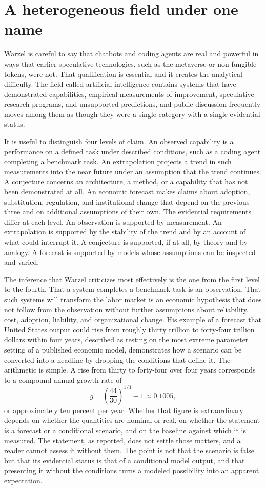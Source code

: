 \documentclass[11pt]{article}
\theoremstyle{plain}
\theoremstyle{definition}
\theoremstyle{remark}
\begin{document}
\section{A heterogeneous field under one name}

Warzel is careful to say that chatbots and coding agents are real and powerful in ways that earlier speculative technologies, such as the metaverse or non-fungible tokens, were not. That qualification is essential and it creates the analytical difficulty. The field called artificial intelligence contains systems that have demonstrated capabilities, empirical measurements of improvement, speculative research programs, and unsupported predictions, and public discussion frequently moves among them as though they were a single category with a single evidential status.

It is useful to distinguish four levels of claim. An observed capability is a performance on a defined task under described conditions, such as a coding agent completing a benchmark task. An extrapolation projects a trend in such measurements into the near future under an assumption that the trend continues. A conjecture concerns an architecture, a method, or a capability that has not been demonstrated at all. An economic forecast makes claims about adoption, substitution, regulation, and institutional change that depend on the previous three and on additional assumptions of their own. The evidential requirements differ at each level. An observation is supported by measurement. An extrapolation is supported by the stability of the trend and by an account of what could interrupt it. A conjecture is supported, if at all, by theory and by analogy. A forecast is supported by models whose assumptions can be inspected and varied.

The inference that Warzel criticizes most effectively is the one from the first level to the fourth. That a system completes a benchmark task is an observation. That such systems will transform the labor market is an economic hypothesis that does not follow from the observation without further assumptions about reliability, cost, adoption, liability, and organizational change. His example of a forecast that United States output could rise from roughly thirty trillion to forty-four trillion dollars within four years, described as resting on the most extreme parameter setting of a published economic model, demonstrates how a scenario can be converted into a headline by dropping the conditions that define it. The arithmetic is simple. A rise from thirty to forty-four over four years corresponds to a compound annual growth rate of
\[
g = \left(\frac{44}{30}\right)^{1/4} - 1 \approx 0.1005,
\]
or approximately ten percent per year. Whether that figure is extraordinary depends on whether the quantities are nominal or real, on whether the statement is a forecast or a conditional scenario, and on the baseline against which it is measured. The statement, as reported, does not settle those matters, and a reader cannot assess it without them. The point is not that the scenario is false but that its evidential status is that of a conditional model output, and that presenting it without the conditions turns a modeled possibility into an apparent expectation.
\end{document}
